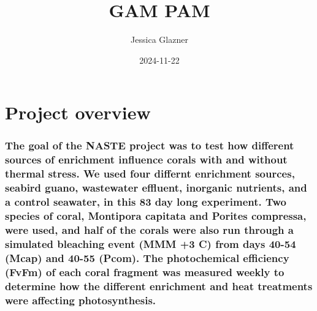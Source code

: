 \documentclass[
]{article}
\title{GAM PAM}
\author{Jessica Glazner}
\date{2024-11-22}
\begin{document}
\maketitle

\hypertarget{project-overview}{%
\section{Project overview}\label{project-overview}}

\hypertarget{the-goal-of-the-naste-project-was-to-test-how-different-sources-of-enrichment-influence-corals-with-and-without-thermal-stress.-we-used-four-differnt-enrichment-sources-seabird-guano-wastewater-effluent-inorganic-nutrients-and-a-control-seawater-in-this-83-day-long-experiment.-two-species-of-coral-montipora-capitata-and-porites-compressa-were-used-and-half-of-the-corals-were-also-run-through-a-simulated-bleaching-event-mmm-3-c-from-days-40-54-mcap-and-40-55-pcom.-the-photochemical-efficiency-fvfm-of-each-coral-fragment-was-measured-weekly-to-determine-how-the-different-enrichment-and-heat-treatments-were-affecting-photosynthesis.}{%
\subsubsection{The goal of the NASTE project was to test how different
sources of enrichment influence corals with and without thermal stress.
We used four differnt enrichment sources, seabird guano, wastewater
effluent, inorganic nutrients, and a control seawater, in this 83 day
long experiment. Two species of coral, Montipora capitata and Porites
compressa, were used, and half of the corals were also run through a
simulated bleaching event (MMM +3 C) from days 40-54 (Mcap) and 40-55
(Pcom). The photochemical efficiency (FvFm) of each coral fragment was
measured weekly to determine how the different enrichment and heat
treatments were affecting
photosynthesis.}\label{the-goal-of-the-naste-project-was-to-test-how-different-sources-of-enrichment-influence-corals-with-and-without-thermal-stress.-we-used-four-differnt-enrichment-sources-seabird-guano-wastewater-effluent-inorganic-nutrients-and-a-control-seawater-in-this-83-day-long-experiment.-two-species-of-coral-montipora-capitata-and-porites-compressa-were-used-and-half-of-the-corals-were-also-run-through-a-simulated-bleaching-event-mmm-3-c-from-days-40-54-mcap-and-40-55-pcom.-the-photochemical-efficiency-fvfm-of-each-coral-fragment-was-measured-weekly-to-determine-how-the-different-enrichment-and-heat-treatments-were-affecting-photosynthesis.}}
\end{document}
